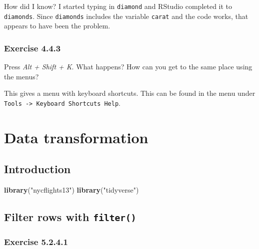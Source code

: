 \documentclass[]{book}
\newenvironment{Shaded}{\begin{snugshade}}{\end{snugshade}}
\newcommand{\KeywordTok}[1]{\textcolor[rgb]{0.13,0.29,0.53}{\textbf{#1}}}
\newcommand{\NormalTok}[1]{#1}
\newcommand{\StringTok}[1]{\textcolor[rgb]{0.31,0.60,0.02}{#1}}
\theoremstyle{plain}
\theoremstyle{remark}
\begin{document}
How did I know? I started typing in \texttt{diamond} and RStudio
completed it to \texttt{diamonds}. Since \texttt{diamonds} includes the
variable \texttt{carat} and the code works, that appears to have been
the problem.

\hypertarget{exercise-4.4.3}{%
\subsection*{\texorpdfstring{Exercise
{4.4.3}}{Exercise 4.4.3}}\label{exercise-4.4.3}}

Press \emph{Alt + Shift + K}. What happens? How can you get to the same
place using the menus?

This gives a menu with keyboard shortcuts. This can be found in the menu
under \texttt{Tools\ -\textgreater{}\ Keyboard\ Shortcuts\ Help}.

\hypertarget{data-transformation}{%
\chapter{Data transformation}\label{data-transformation}}

\hypertarget{introduction-2}{%
\section{Introduction}\label{introduction-2}}

\begin{Shaded}
\begin{Highlighting}[]
\KeywordTok{library}\NormalTok{(}\StringTok{"nycflights13"}\NormalTok{)}
\KeywordTok{library}\NormalTok{(}\StringTok{"tidyverse"}\NormalTok{)}
\end{Highlighting}
\end{Shaded}

\hypertarget{filter-rows-with-filter}{%
\section{\texorpdfstring{Filter rows with
\texttt{filter()}}{Filter rows with filter()}}\label{filter-rows-with-filter}}

\hypertarget{exercise-5.2.4.1}{%
\subsection*{\texorpdfstring{Exercise
{5.2.4.1}}{Exercise 5.2.4.1}}\label{exercise-5.2.4.1}}
\end{document}
